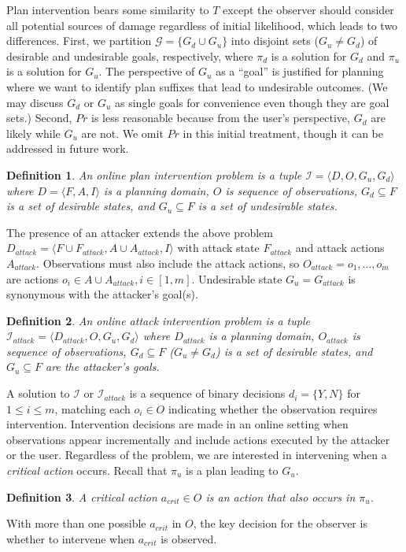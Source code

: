 \documentclass[letterpaper]{article}
\theoremstyle{plain}
\newtheorem{definition}{Definition}
\begin{document}
Plan intervention bears some similarity to $T$ except the observer should consider all potential sources of damage regardless of initial likelihood, which leads to two differences.
First, we partition $\mathcal{G} = \lbrace G_d \cup G_u \rbrace$ into disjoint sets ($G_u \neq G_d$) of desirable and undesirable goals, respectively, where $\pi_d$ is a solution for $G_d$ and $\pi_u$ is a solution for $G_u$.
The perspective of $G_u$ as a ``goal'' is justified for planning where we want to identify plan suffixes that lead to undesirable outcomes.
(We may discuss $G_d$ or $G_u$ as single goals for convenience even though they are goal sets.)
Second, $Pr$ is less reasonable because from the user's perspective, $G_d$ are likely while $G_u$ are not.
We omit $Pr$ in this initial treatment, though it can be addressed in future work.

\theoremstyle{definition}
\begin{definition}
An \textnormal{online plan intervention problem} is a tuple $\mathcal{I} = \langle D, O, G_u, G_d \rangle$ where $D=\langle F, A, I \rangle$ is a planning domain, 
$O$ is  sequence of observations,
$G_d \subseteq F$ is a set of desirable states, and
$G_u \subseteq F$ is a set of undesirable states.
\end{definition}

The presence of an attacker extends the above problem $D_{attack}=\langle F \cup F_{attack}, A \cup A_{attack}, I \rangle$ with attack state $F_{attack}$ and attack actions $A_{attack}$.
Observations must also include the attack actions, so 
$O_{attack} = o_1, \ldots , o_m$ are actions $o_i \in A \cup A_{attack}, i \in[1,m]$.
Undesirable state $G_u = G_{attack}$ is synonymous with the attacker's goal(s).
\theoremstyle{definition}
\begin{definition}
An \textnormal{online \emph{attack} intervention problem} is a tuple $\mathcal{I}_{attack} = \langle D_{attack}, O, G_u, G_d \rangle$ where $D_{attack}$ is a planning domain, 
$O_{attack}$ is  sequence of observations,
$G_d \subseteq F$ ($G_u \neq G_d$) is a set of desirable states, and
$G_u \subseteq F$ are the attacker's goals.
\end{definition}

A solution to $\mathcal{I}$ or $\mathcal{I}_{attack}$ is a sequence of binary decisions $d_i = \lbrace Y, N \rbrace$ for $1 \leq i \leq m$, matching each $o_i \in O$ indicating whether the observation requires intervention. 
Intervention decisions are made in an online setting when observations appear incrementally and include actions executed by the attacker or the user.
Regardless of the problem, we are interested in intervening when a \emph{critical action} occurs.
Recall that $\pi_u$ is a plan leading to $G_u$.
\begin{definition}
A \textnormal{critical action} $a_{crit} \in O$ is an action that also occurs in $\pi_u$.
\end{definition}
\noindent With more than one possible $a_{crit}$ in $O$, the key decision for the observer is whether to intervene when $a_{crit}$ is observed.
\end{document}
